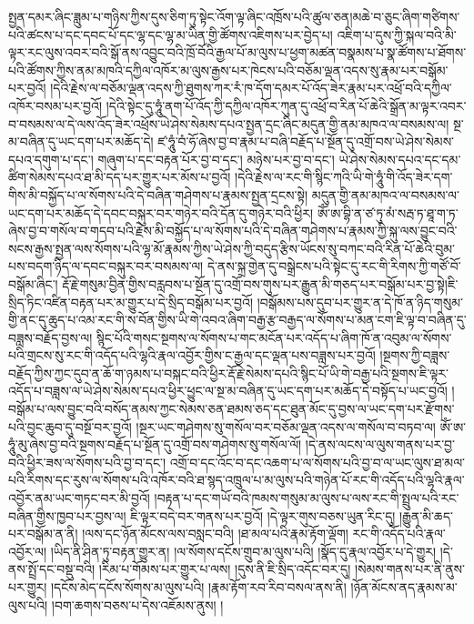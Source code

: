 སྤྱན་དམར་ཞིང་ཟླུམ་པ་གཉིས་ཀྱིས་དུས་ཅིག་ཏུ་སྟེང་འོག་ལྟ་ཞིང་འཁྲོས་པའི་ཚུལ་ཅན།མཆེ་བ་ཅུང་ཞིག་གཙིགས་པའི་ཚངས་པ་དང་དབང་པོ་དང་ལྷ་དང་ལྷ་མ་ཡིན་གྱི་ཚོགས་འཇིགས་པར་བྱེད་པ། འཇིག་པ་དུས་ཀྱི་སྐལ་བའི་མི་ལྟར་རང་ལུས་འབར་བའི་སྒོ་ནས་འབྱུང་བའི་ཁྲོ་བོའི་རྒྱལ་པོ་མ་ལུས་པ་ཕྱག་མཚན་བསྣམས་པ་སྣ་ཚོགས་པ་ཐོགས་པའི་ཚོགས་ཀྱིས་ནམ་མཁའི་དཀྱིལ་འཁོར་མ་ལུས་རྒྱས་པར་ཁེངས་པའི་བཅོམ་ལྡན་འདས་སུ་རྣམ་པར་བསྒོམ་པར་བྱའོ། །དེའི་རྗེས་ལ་བཅོམ་ལྡན་འདས་ཀྱི་ཐུགས་ཀར་རཾ་ཁ་དོག་དམར་པོ་འོད་ཟེར་རྣམ་པར་འཕྲོ་བའི་དཀྱིལ་འཁོར་བསམ་པར་བྱའོ། །དེའི་སྟེང་དུ་ཧཱུཾ་ནག་པོ་འོད་ཀྱི་དཀྱིལ་འཁོར་ཀུན་དུ་འཕྲོ་བ་རིན་པོ་ཆེའི་སྒྲོན་མ་ལྟར་འབར་བ་བསམས་ལ་དེ་ལས་འོད་ཟེར་འཕྲོས་ཡེ་ཤེས་སེམས་དཔའ་སྤྱན་དྲང་ཞིང་མདུན་གྱི་ནམ་མཁའ་ལ་བསམས་ལ། སྔ་མ་བཞིན་དུ་ཡང་དག་པར་མཆོད་དེ། ཛ་ཧཱུཾ་བཾ་ཧོ་ཞེས་བྱ་བ་རྣམ་པ་བཞི་བརྗོད་པ་སྔོན་དུ་འགྲོ་བས་ཡེ་ཤེས་སེམས་དཔའ་དགུག་པ་དང་། གཞུག་པ་དང་བརྟན་པོར་བྱ་བ་དང་། མཉེས་པར་བྱ་བ་དང་། ཡེ་ཤེས་སེམས་དཔའ་དང་དམ་ཚིག་སེམས་དཔའ་ཐ་མི་དད་པར་གྱུར་པར་མོས་པ་བྱའོ། །དེའི་རྗེས་ལ་རང་གི་སྙིང་ཀའི་ཡི་གེ་ཧཱུཾ་གི་འོད་ཟེར་དག་གིས་མི་བསྐྱོད་པ་ལ་སོགས་པའི་དེ་བཞིན་གཤེགས་པ་རྣམས་སྤྱན་དྲངས་སྟེ། མདུན་གྱི་ནམ་མཁའ་ལ་བསམས་ལ་ཡང་དག་པར་མཆོད་དེ་དབང་བསྐུར་བར་གཉེར་བའི་དོན་དུ་གཉེར་བའི་ཕྱིར། ཨོཾ་ཨ་བྷི་ན་ཙ་ཏུ་མཾ་སརྦ་ཏ་ཐཱ་ག་ཏ་ཞེས་བྱ་བ་གསོལ་བ་གདབ་པའི་རྗེས་མི་བསྐྱོད་པ་ལ་སོགས་པའི་དེ་བཞིན་གཤེགས་པ་རྣམས་ཀྱི་སྐུ་ལས་བྱུང་བའི་སངས་རྒྱས་སྤྱན་ལས་སོགས་པའི་ལྷ་མོ་རྣམས་ཀྱིས་ཡེ་ཤེས་ཀྱི་བདུད་རྩིས་ཡོངས་སུ་བཀང་བའི་རིན་པོ་ཆེའི་བུམ་པས་བདག་ཉིད་ལ་དབང་བསྐུར་བར་བསམས་ལ། དེ་ནས་སྐྲ་གྱེན་དུ་བསྒྲེངས་པའི་སྟེང་དུ་རང་གི་རིགས་ཀྱི་གཙོ་བོ་བསྒོམ་ཞིང་། རྡོ་རྗེ་གསུམ་བྱིན་གྱིས་བརླབས་པ་སྔོན་དུ་འགྲོ་བས་གུས་པར་རྒྱུན་མི་གཅད་པར་བསྒོམ་པར་བྱ་སྟེ།ཇི་སྲིད་ཏིང་འཛིན་བརྟན་པར་མ་གྱུར་པ་དེ་སྲིད་བསྒོམ་པར་བྱའོ། །བསྒོམས་པས་དུབ་པར་གྱུར་ན་དེ་ཁོ་ན་ཉིད་གསུམ་གྱི་ནང་དུ་ཆུད་པ་འམ་རང་གི་ས་བོན་གྱིས་ཡི་གེ་འབའ་ཞིག་བརྒྱ་རྩ་བརྒྱད་ལ་སོགས་པ་མན་ངག་ཇི་ལྟ་བ་བཞིན་དུ་བཟླས་བརྗོད་བྱས་ལ། སྙིང་པོའི་གསང་སྔགས་ལ་སོགས་པ་གང་མངོན་པར་འདོད་པ་ཞིག་ཁོ་ན་འབུམ་ལ་སོགས་པའི་གྲངས་སུ་རང་གི་འདོད་པའི་ལྷའི་རྣལ་འབྱོར་གྱིས་ང་རྒྱལ་དང་ལྡན་པས་བཟླས་པར་བྱའོ། །སྔགས་ཀྱི་བཟླས་བརྗོད་ཀྱིས་ཀྱང་དུབ་ན་ཆོ་ག་ཉམས་པ་བསྐང་བའི་ཕྱིར་རྡོ་རྗེ་སེམས་དཔའི་སྙིང་པོ་ཡི་གེ་བརྒྱ་པའི་སྔགས་ཇི་ལྟར་འདོད་པ་བཟླས་ལ་ཡེ་ཤེས་སེམས་དཔའ་ཕྱིར་ཕྱུང་ལ་སྔ་མ་བཞིན་དུ་ཡང་དག་པར་མཆོད་དེ་བསྟོད་པ་ཡང་བྱའོ། །བསྒོམ་པ་ལས་བྱུང་བའི་བསོད་ནམས་ཀྱང་སེམས་ཅན་ཐམས་ཅད་དང་ཐུན་མོང་དུ་བྱས་ལ་ཡང་དག་པར་རྫོགས་པའི་བྱང་ཆུབ་དུ་བསྔོ་བར་བྱའོ། །སྔར་ཡང་གཤེགས་སུ་གསོལ་བར་བཅོམ་ལྡན་འདས་ལ་གསོལ་བ་བཏབ་ལ། ཨོཾ་ཨ་ཧཱུཾ་མུ་ཞེས་བྱ་བའི་སྔགས་བརྗོད་པ་སྔོན་དུ་འགྲོ་བས་གཤེགས་སུ་གསོལ་ལོ། །དེ་ནས་ལངས་ལ་ལུས་གནས་པར་བྱ་བའི་ཕྱིར་ཟས་ལ་སོགས་པའི་བྱ་བ་དང་། འགྲོ་བ་དང་འོང་བ་དང་འཆག་པ་ལ་སོགས་པའི་བྱ་བ་ལ་ཡང་ལུས་ཐ་མལ་པའི་རིགས་དང་རུས་ལ་སོགས་པའི་འཁོར་བའི་ཐ་སྙད་འཁྲུལ་པ་མ་ལུས་པའི་གཉེན་པོ་རང་གི་འདོད་པའི་ལྷའི་རྣལ་འབྱོར་ནམ་ཡང་གཏང་བར་མི་བྱའོ། །བརྟན་པ་དང་གཡོ་བའི་ཁམས་གསུམ་མ་ལུས་པ་ལས་རང་གི་སྤྲུལ་པའི་རང་བཞིན་གྱིས་ཁྱབ་པར་བྱས་ལ། ཇི་ལྟར་བདེ་བར་གནས་པར་བྱའོ། །དེ་ལྟར་གུས་བཅས་ཡུན་རིང་དུ། །རྒྱུན་མི་ཆད་པར་བསྒོམ་ན་ནི། །ལས་དང་ཉོན་མོངས་ལས་བསླང་བའི། །ཐ་མལ་པའི་རྣམ་རྟོག་ལྡོག། རང་གི་འདོད་པའི་རྣལ་འབྱོར་ལ། །ཡིད་ནི་ཤིན་ཏུ་བརྟན་གྱུར་ན། །ལ་སོགས་དངོས་གྲུབ་མ་ལུས་པའི། །སྣོད་དུ་རྣལ་འབྱོར་པ་དེ་གྱུར། །དེ་ནས་སྤྲོ་དང་བསྡུ་བའི། །རིམ་པ་གོམས་པར་གྱུར་པ་ལས། །དུས་ནི་ཇི་སྲིད་འདོང་བར་དུ། །སེམས་གནས་པར་ནི་ནུས་པར་གྱུར། །དངོས་མེད་དངོས་སོགས་མ་ལུས་པའི། །རྣམ་རྟོག་རབ་རིབ་བསལ་ནས་ནི། །ཉོན་མོངས་ནད་རྣམས་མ་ལུས་པའི། །བག་ཆགས་བཅས་པ་དེས་འཇོམས་ནུས། །
